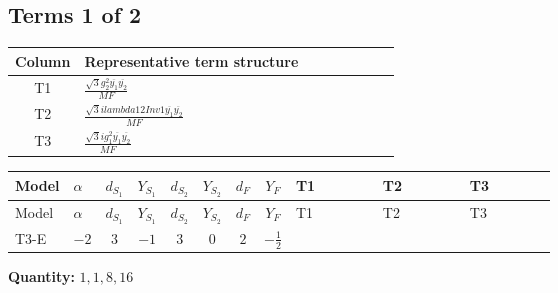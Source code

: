 \documentclass[8pt]{article}
\begin{document}
\begin{landscape}
\subsection*{Terms 1 of 2}
\begin{center}
\begin{tabular}{@{}c >{\raggedright\arraybackslash}p{0.82\linewidth}@{}}
\toprule
Column & Representative term structure \\
\midrule
T1 & \(\displaystyle \frac{\sqrt{3} g_{2}^{2} \overline{y_{1}} \overline{y_{2}}}{MF}\) \\
\midrule
T2 & \(\displaystyle \frac{\sqrt{3} i lambda12Inv1 \overline{y_{1}} \overline{y_{2}}}{MF}\) \\
\midrule
T3 & \(\displaystyle \frac{\sqrt{3} i g_{1}^{2} \overline{y_{1}} \overline{y_{2}}}{MF}\) \\
\midrule
\bottomrule
\end{tabular}
\end{center}
\smallskip
\tiny
\begin{longtable}{@{}llcccccc >{\raggedright\arraybackslash}p{0.21\linewidth} >{\raggedright\arraybackslash}p{0.21\linewidth} >{\raggedright\arraybackslash}p{0.21\linewidth}@{}}
\toprule
Model & $\alpha$ & $d_{S_1}$ & $Y_{S_1}$ & $d_{S_2}$ & $Y_{S_2}$ & $d_F$ & $Y_F$ & T1 & T2 & T3 \\
\midrule
\endfirsthead
\toprule
Model & $\alpha$ & $d_{S_1}$ & $Y_{S_1}$ & $d_{S_2}$ & $Y_{S_2}$ & $d_F$ & $Y_F$ & T1 & T2 & T3 \\
\midrule
\endhead
T3-E & $-2$ & $3$ & $-1$ & $3$ & $0$ & $2$ & $-\frac{1}{2}$ & \scriptsize\adjustbox{max width=\linewidth}{$\begin{gathered} \frac{\sqrt{3} g_{2}^{2} \overline{y_{1}} \overline{y_{2}}}{6 MF}\end{gathered}$} & \scriptsize\adjustbox{max width=\linewidth}{$\begin{gathered} - \frac{\sqrt{3} i lambda12Inv1 \overline{y_{1}} \overline{y_{2}}}{6 MF}\end{gathered}$} & \scriptsize\adjustbox{max width=\linewidth}{$\begin{gathered} \frac{\sqrt{3} i g_{1}^{2} \overline{y_{1}} \overline{y_{2}}}{8 MF}\end{gathered}$} \\
\midrule
\bottomrule
\end{longtable}
\clearpage
\noindent\textbf{Quantity: }$\mathrm{1,1,8,16}$\par\smallskip

\end{landscape}
\end{document}
